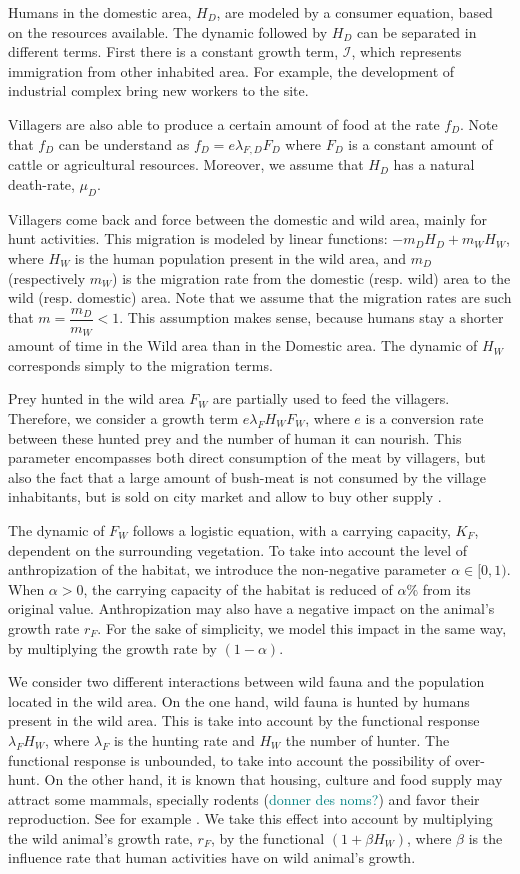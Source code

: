\documentclass{article}
\newcommand{\lfw}{\lambda_{F}}
\newcommand{\lfd}{\lambda_{F, D}}
\newcommand{\lfw}{\lambda_{F}}
\newcommand{\cI}{\mathcal{I}}
\newcommand{\marc}[1]{\textcolor{teal}{#1}}
\begin{document}
Humans in the domestic area, $H_D$, are modeled by a consumer equation, based on the resources available. The dynamic followed by $H_D$ can be separated in different terms. 
First there is a constant growth term, $\cI$, which represents immigration from other inhabited area. For example, the development of industrial complex bring new workers to the site.

Villagers are also able to produce a certain amount of food at the rate $f_D$. Note that $f_D$ can be understand as $f_D = e \lfd F_D$ where $F_D$ is a constant amount of cattle or agricultural resources. 
Moreover, we assume that $H_D$ has a natural death-rate, $\mu_D$.

Villagers come back and force between the domestic and wild area, mainly for hunt activities. This migration is modeled by linear functions: $-m_D H_D + m_W H_W$, where $H_W$ is the human population present in the wild area, and $m_D$ (respectively $m_W$) is the migration rate from the domestic (resp. wild) area to the wild (resp. domestic) area. Note that we assume that the migration rates are such that $m = \dfrac{m_D}{m_W} < 1$. This assumption makes sense, because humans stay a shorter amount of time in the Wild area than in the Domestic area.
The dynamic of $H_W$ corresponds simply to the migration terms. 

Prey hunted in the wild area $F_W$ are partially used to feed the villagers. Therefore, we consider a growth term $e \lfw H_W F_W$, where $e$ is a conversion rate between these hunted prey and the number of human it can nourish. This parameter encompasses both direct consumption of the meat by villagers, but also the fact that a large amount of bush-meat is not consumed by the village inhabitants, but is sold on city market and allow to buy other supply \cite{wilkie_bushmeat_1998}.


The dynamic of $F_W$ follows a logistic equation, with a carrying capacity, $K_F$, dependent on the surrounding vegetation. To take into account the level of anthropization of the habitat, we introduce the non-negative parameter $\alpha \in [0, 1)$. When $\alpha > 0$, the carrying capacity of the habitat is reduced of $\alpha \%$ from its original value. Anthropization may also have a negative impact on the animal's growth rate $r_F$. For the sake of simplicity, we model this impact in the same way, by multiplying the growth rate by $(1-\alpha)$.

We consider two different interactions between wild fauna and the population located in the wild area. On the one hand, wild fauna is hunted by humans present in the wild area. This is take into account by the functional response $\lfw H_W$, where $\lfw$ is the hunting rate and $H_W$ the number of hunter. The functional response is unbounded, to take into account the possibility of over-hunt. On the other hand, it is known that housing, culture and food supply may attract some mammals, specially rodents (\marc{donner des noms?}) and favor their reproduction. See for example \cite{dounias_foraging_2011, dobigny_zoonotic_2022}. We take this effect into account by multiplying the wild animal's growth rate, $r_F$, by the functional $(1 +  \beta H_W)$, where $\beta$ is the influence rate that human activities have on wild animal's growth.
\end{document}

